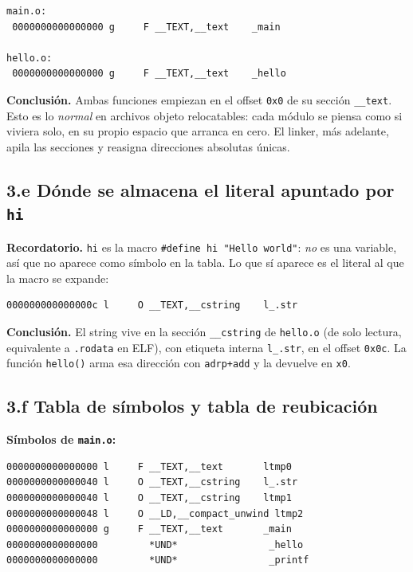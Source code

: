 \documentclass[11pt,a4paper]{article}
\begin{document}
\begin{lstlisting}[style=asmstyle]
main.o:
 0000000000000000 g     F __TEXT,__text    _main

hello.o:
 0000000000000000 g     F __TEXT,__text    _hello
\end{lstlisting}

\textbf{Conclusión.} Ambas funciones empiezan en el offset
\texttt{0x0} de su sección \texttt{\_\_text}. Esto es lo
\emph{normal} en archivos objeto relocatables: cada módulo se piensa
como si viviera solo, en su propio espacio que arranca en cero. El
linker, más adelante, apila las secciones y reasigna direcciones
absolutas únicas.

\subsection*{3.e Dónde se almacena el literal apuntado por \texttt{hi}}

\textbf{Recordatorio.} \texttt{hi} es la macro \texttt{\#define hi
"Hello world"}: \emph{no} es una variable, así que no aparece como
símbolo en la tabla. Lo que sí aparece es el literal al que la macro
se expande:

\begin{lstlisting}[style=asmstyle]
000000000000000c l     O __TEXT,__cstring    l_.str
\end{lstlisting}

\textbf{Conclusión.} El string vive en la sección \texttt{\_\_cstring}
de \texttt{hello.o} (de solo lectura, equivalente a \texttt{.rodata}
en ELF), con etiqueta interna \texttt{l\_.str}, en el offset
\texttt{0x0c}. La función \texttt{hello()} arma esa dirección con
\texttt{adrp+add} y la devuelve en \texttt{x0}.

\subsection*{3.f Tabla de símbolos y tabla de reubicación}

\textbf{Símbolos de \texttt{main.o}:}

\begin{lstlisting}[style=asmstyle]
0000000000000000 l     F __TEXT,__text       ltmp0
0000000000000040 l     O __TEXT,__cstring    l_.str
0000000000000040 l     O __TEXT,__cstring    ltmp1
0000000000000048 l     O __LD,__compact_unwind ltmp2
0000000000000000 g     F __TEXT,__text       _main
0000000000000000         *UND*                _hello
0000000000000000         *UND*                _printf
\end{lstlisting}
\end{document}
